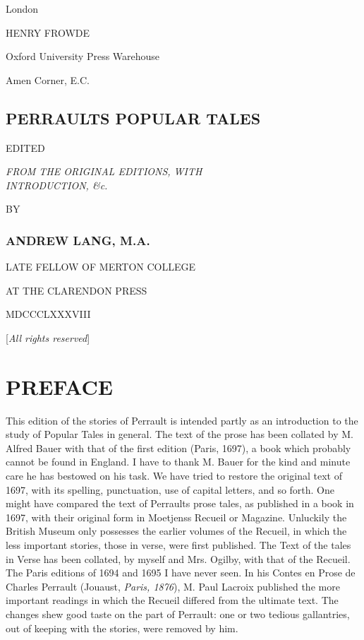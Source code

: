 \documentclass[14pt,a4paper]{memoir}
\begin{document}
London

HENRY FROWDE


{Oxford University Press Warehouse}

{Amen Corner, E.C.}

\subsection{PERRAULT\textquotesingle S POPULAR TALES}

EDITED

\emph{FROM THE ORIGINAL EDITIONS, WITH\\
INTRODUCTION, \&c.}

BY

\subsubsection{ANDREW LANG, M.A.}

LATE FELLOW OF MERTON COLLEGE


AT THE CLARENDON PRESS

MDCCCLXXXVIII

{[}\emph{All rights reserved}{]}



\newpage
\section{PREFACE}

This edition of the stories of Perrault is intended partly
as an introduction to the study of Popular Tales in general. The text of
the prose has been collated by M. Alfred Bauer with that of the
first edition (Paris, 1697), a book which probably cannot be found in
England. I have to thank M. Bauer for the kind and minute care he
has bestowed on his task. We have tried to restore the original text of
1697, with its spelling, punctuation, use of capital letters, and so
forth. One might have compared the text of Perrault\textquotesingle s
prose tales, as published in a book in 1697, with their original
form in Moetjens\textquotesingle s Recueil or Magazine. Unluckily
the British Museum only possesses the earlier volumes of the Recueil, in
which the less important stories, those in verse, were first published.
The Text of the tales in Verse has been collated, by myself and Mrs.
Ogilby, with that of the Recueil. The Paris editions of 1694 and
1695 I have never seen. In his \textquotesingle Contes en Prose de
Charles Perrault\textquotesingle{} (Jouaust, \emph{Paris, 1876}), M.
Paul Lacroix published the more important readings in which the
Recueil differed from the ultimate text. The changes shew good taste on
the part of Perrault: one or two tedious gallantries, out of
keeping with the stories, were removed by him.
\end{document}
